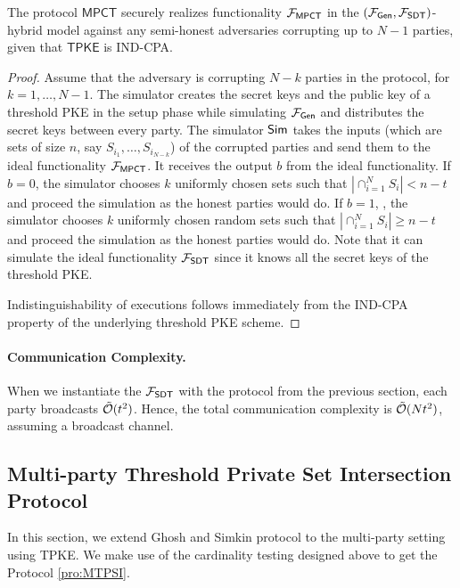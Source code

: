 \begin{theorem}
The protocol $\mathsf{MPCT}$ securely realizes functionality $\mathcal{F}_{\mathsf{MPCT}}$ in the $(\mathcal{F}_{\mathsf{Gen}},\mathcal{F}_{\mathsf{SDT}})$-hybrid model against any semi-honest adversaries corrupting up to $N-1$ parties, given that $\mathsf{TPKE}$ is IND-CPA.
\end{theorem}{}

\begin{proof}

Assume that the adversary is corrupting $N-k$ parties in the protocol, for $k=1,\dots, N-1$. The simulator creates the secret keys and the public key of a threshold PKE in the setup phase while simulating $\mathcal{F}_\mathsf{Gen}$ and distributes the secret keys between every party. The simulator $\mathsf{Sim}$ takes the inputs (which are sets of size $n$, say $S_{i_1},\dots ,S_{i_{N-k}}$) of the corrupted parties and send them to the ideal functionality $\mathcal{F}_\mathsf{MPCT}$. It receives the output $b$ from the ideal functionality. If $b=0$, the simulator chooses $k$ uniformly chosen sets such that $|\cap_{i=1}^N S_i|< n-t$ and proceed the simulation as the honest parties would do. If $b=1$, , the simulator chooses $k$ uniformly chosen random sets such that $|\cap_{i=1}^N S_i|\geq n-t$ and proceed the simulation as the honest parties would do. Note that it can simulate the ideal functionality $\mathcal{F}_\mathsf{SDT}$ since it knows all the secret keys of the threshold PKE.

Indistinguishability of executions follows immediately from the IND-CPA property of the underlying threshold PKE scheme.
\end{proof}{}

\paragraph{Communication Complexity.} When we instantiate the $\mathcal{F}_\mathsf{SDT}$ with the protocol from the previous section, each party broadcasts $\tilde {\mathcal{O}}(t^2)$. Hence, the total communication complexity is $\tilde {\mathcal{O}}(Nt^2)$, assuming a broadcast channel.


\subsection{Multi-party Threshold Private Set Intersection Protocol}

In this section, we extend Ghosh and Simkin protocol \cite{C:GhoSim19} to the multi-party setting using TPKE. We make use of the cardinality testing designed above to get the Protocol \ref{pro:MTPSI}.


